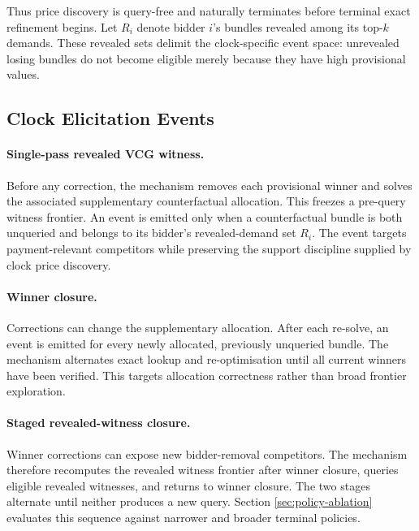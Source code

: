 Thus price discovery is query-free and naturally terminates before terminal
exact refinement begins. Let \(R_i\) denote bidder \(i\)'s bundles revealed
among its top-\(k\) demands. These revealed sets delimit the clock-specific
event space: unrevealed losing bundles do not become eligible merely because
they have high provisional values.

\subsection{Clock Elicitation Events}

\paragraph{Single-pass revealed VCG witness.}
Before any correction, the mechanism removes each provisional winner and
solves the associated supplementary counterfactual allocation. This freezes a
pre-query witness frontier. An event is emitted only when a counterfactual
bundle is both unqueried and belongs to its bidder's revealed-demand set
\(R_i\). The event targets payment-relevant competitors while preserving the
support discipline supplied by clock price discovery.

\paragraph{Winner closure.}
Corrections can change the supplementary allocation. After each re-solve, an
event is emitted for every newly allocated, previously unqueried bundle. The
mechanism alternates exact lookup and re-optimisation until all current winners
have been verified. This targets allocation correctness rather than broad
frontier exploration.

\paragraph{Staged revealed-witness closure.}
Winner corrections can expose new bidder-removal competitors. The mechanism
therefore recomputes the revealed witness frontier after winner closure,
queries eligible revealed witnesses, and returns to winner closure. The two
stages alternate until neither produces a new query. Section
\ref{sec:policy-ablation} evaluates this sequence against narrower and broader
terminal policies.

